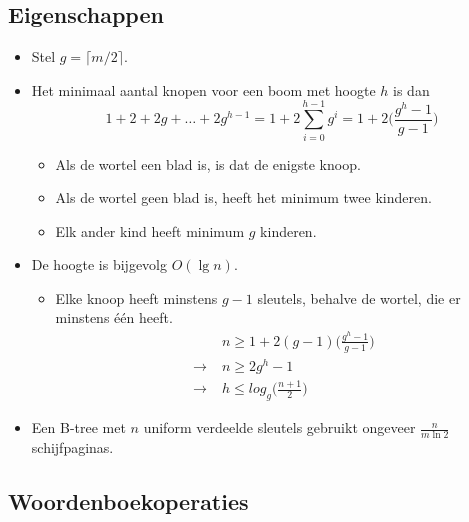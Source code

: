 \subsection{Eigenschappen}
\begin{itemize}
    \item Stel $g = \lceil m/2 \rceil$.
    \item Het minimaal aantal knopen voor een boom met hoogte $h$ is dan
    $$1 + 2 + 2g + \dots + 2g^{h - 1} = 1 + 2\sum_{i=0}^{h - 1}g^i = 1 + 2\bigg(\frac{g^h - 1}{g - 1}\bigg) $$
    \begin{itemize}
        \item Als de wortel een blad is, is dat de enigste knoop.
        \item Als de wortel geen blad is, heeft het minimum twee kinderen.
        \item Elk ander kind heeft minimum $g$ kinderen.
    \end{itemize}
    \item De hoogte is bijgevolg $O(\lg n)$.
    \begin{itemize}
        \item Elke knoop heeft minstens $g - 1$ sleutels, behalve de wortel, die er minstens één heeft.
        \begin{align*}
            & n \geq 1 + 2(g - 1)\bigg(\frac{g^h - 1}{g - 1} \bigg) \\
            \rightarrow \;& n \geq 2g^h - 1 \\
            \rightarrow \;& h \leq log_g\bigg(\frac{n+1}{2}\bigg)
        \end{align*}
    \end{itemize}
    \item Een B-tree met $n$ uniform verdeelde sleutels gebruikt ongeveer $\frac{n}{m\ln 2}$ schijfpaginas. 
\end{itemize}

\subsection{Woordenboekoperaties}

